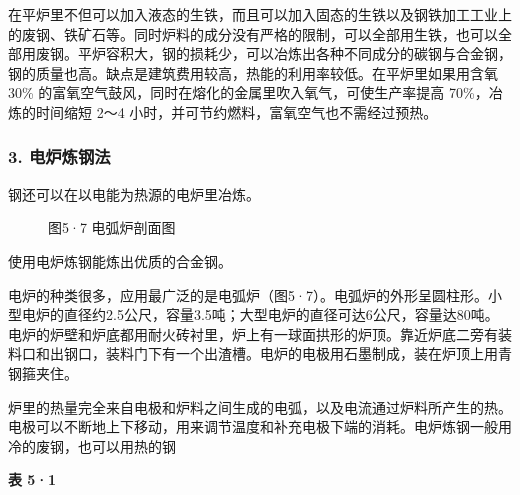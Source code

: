 在平炉里不但可以加入液态的生铁，而且可以加入固态的生铁以及钢铁加工工业上的废钢、铁矿石等。同时炉料的成分没有严格的限制，可以全部用生铁，也可以全部用废钢。平炉容积大，钢的损耗少，可以冶炼出各种不同成分的碳钢与合金钢，钢的质量也高。缺点是建筑费用较高，热能的利用率较低。在平炉里如果用含氧
30\% 的富氧空气鼓风，同时在熔化的金属里吹入氧气，可使生产率提高
70\%，冶炼的时间缩短 2～4 小时，并可节约燃料，富氧空气也不需经过预热。

\subsubsection{3. 电炉炼钢法}

钢还可以在以电能为热源的电炉里冶炼。

\begin{figure}
\centering
\caption{图5·7 电弧炉剖面图}
\end{figure}

使用电炉炼钢能炼出优质的合金钢。

电炉的种类很多，应用最广泛的是电弧炉（图5·7）。电弧炉的外形呈圆柱形。小型电炉的直径约2.5公尺，容量3.5吨；大型电炉的直径可达6公尺，容量达80吨。电炉的炉壁和炉底都用耐火砖衬里，炉上有一球面拱形的炉顶。靠近炉底二旁有装料口和出钢口，装料门下有一个出渣槽。电炉的电极用石墨制成，装在炉顶上用青钢箍夹住。

炉里的热量完全来自电极和炉料之间生成的电弧，以及电流通过炉料所产生的热。电极可以不断地上下移动，用来调节温度和补充电极下端的消耗。电炉炼钢一般用冷的废钢，也可以用热的钢

\textbf{表 5·1}

